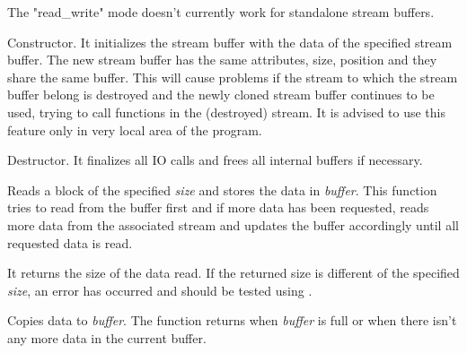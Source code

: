 
The "read\_write" mode doesn't currently work for standalone stream buffers.


Constructor. It initializes the stream buffer with the data of the specified
stream buffer. The new stream buffer has the same attributes, size, position
and they share the same buffer. This will cause problems if the stream to
which the stream buffer belong is destroyed and the newly cloned stream
buffer continues to be used, trying to call functions in the (destroyed)
stream. It is advised to use this feature only in very local area of the
program.



\label{wxstreambufferdtor}


Destructor. It finalizes all IO calls and frees all internal buffers if
necessary.

\label{wxstreambufferread}


Reads a block of the specified {\it size} and stores the data in {\it buffer}.
This function tries to read from the buffer first and if more data has been
requested, reads more data from the associated stream and updates the buffer
accordingly until all requested data is read.


It returns the size of the data read. If the returned size is different of the specified 
{\it size}, an error has occurred and should be tested using 
.


Copies data to {\it buffer}. The function returns when {\it buffer} is full or when there isn't
any more data in the current buffer.



\label{wxstreambufferwrite}

